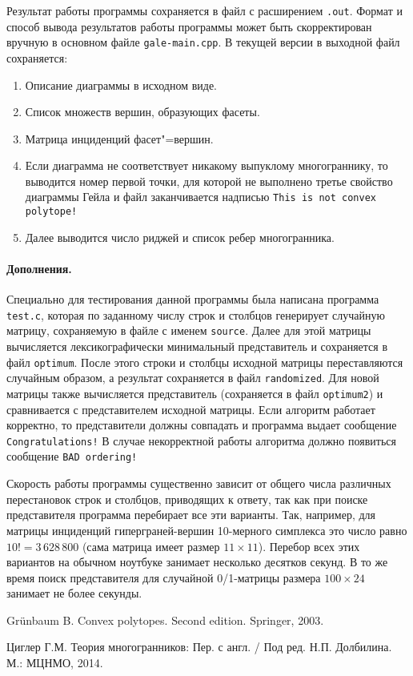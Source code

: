 \documentclass[12pt]{article}
\begin{document}
Результат работы программы сохраняется в файл с расширением \texttt{.out}. Формат и способ вывода результатов работы программы может быть скорректирован вручную в основном файле \texttt{gale-main.cpp}. В текущей версии в выходной файл сохраняется:
\begin{enumerate}
	\item Описание диаграммы в исходном виде.
	\item Список множеств вершин, образующих фасеты.
	\item Матрица инциденций фасет"=вершин.
	\item Если диаграмма не соответствует никакому выпуклому многограннику, то выводится номер первой точки, для которой не выполнено третье свойство диаграммы Гейла и файл заканчивается надписью	\texttt{This is not convex polytope!}
	\item Далее выводится число риджей и список ребер многогранника.
\end{enumerate}  

\paragraph{Дополнения.}
Специально для тестирования данной программы была написана программа \texttt{test.c},
которая по заданному числу строк и столбцов генерирует случайную матрицу,
сохраняемую в файле с именем \texttt{source}.
Далее для этой матрицы вычисляется лексикографически минимальный представитель
и сохраняется в файл \texttt{optimum}.
После этого строки и столбцы исходной матрицы переставляются случайным образом,
а результат сохраняется в файл \texttt{randomized}.
Для новой матрицы также вычисляется представитель (сохраняется в файл \texttt{optimum2})
и сравнивается с представителем исходной матрицы.
Если алгоритм работает корректно, то представители должны совпадать
и программа выдает сообщение \texttt{Congratulations!}
В случае некорректной работы алгоритма должно появиться сообщение \texttt{BAD ordering!}

Скорость работы программы существенно зависит от общего числа различных 
перестановок строк и столбцов, приводящих к ответу, так как при поиске
представителя программа перебирает все эти варианты.
Так, например, для матрицы инциденций гиперграней-вершин 10-мерного симплекса
это число равно $10! = 3\,628\,800$ (сама матрица имеет размер $11\times11$).
Перебор всех этих вариантов на обычном ноутбуке занимает несколько десятков секунд.
В то же время поиск представителя для случайной 0/1-матрицы размера $100\times24$
занимает не более секунды.

\begin{thebibliography}{9}
    
Gr\"unbaum B.
Convex polytopes. Second edition.
Springer, 2003. 
 
Циглер Г.М. 
Теория многогранников: Пер. с англ. / Под ред. Н.П. Долбилина. М.: МЦНМО, 2014. 

\end{thebibliography}
\end{document}
